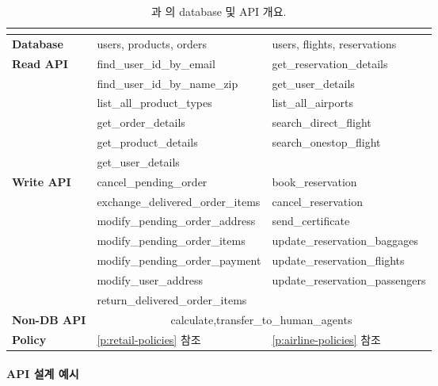 \begin{table}[h]

\centering
\begin{tabular}{lll}
\toprule
 & \textbf{\retail{}} & \textbf{\airline{}} \\
\midrule
\textbf{Database} & users, products, orders & users, flights, reservations \\
\midrule
\textbf{Read API} & find\_user\_id\_by\_email & get\_reservation\_details \\
& find\_user\_id\_by\_name\_zip & get\_user\_details \\
& list\_all\_product\_types & list\_all\_airports \\
& get\_order\_details & search\_direct\_flight \\
& get\_product\_details  & search\_onestop\_flight \\
& get\_user\_details & \\
\midrule
\textbf{Write API} & cancel\_pending\_order & book\_reservation \\
& exchange\_delivered\_order\_items & cancel\_reservation \\
& modify\_pending\_order\_address & send\_certificate \\
& modify\_pending\_order\_items & update\_reservation\_baggages \\
& modify\_pending\_order\_payment & update\_reservation\_flights \\
& modify\_user\_address & update\_reservation\_passengers \\
& return\_delivered\_order\_items & \\
\midrule
\textbf{Non-DB API} & \multicolumn{2}{c}{calculate,\quad transfer\_to\_human\_agents} \\
\midrule
\textbf{Policy} & \ref{p:retail-policies} 참조 & \ref{p:airline-policies} 참조 \\
\bottomrule
\end{tabular}
\label{tab:domains_rich}
\vspace{10pt}
\caption{\retail{}과 \airline{}의 database 및 API 개요.}

\end{table}

\paragraph{API 설계 예시}


